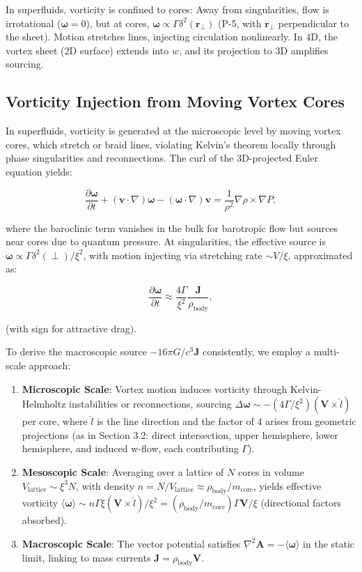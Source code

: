 \documentclass{article}
\begin{document}
In superfluids, vorticity is confined to cores: Away from singularities, flow is irrotational ($\boldsymbol{\omega} = 0$), but at cores, $\boldsymbol{\omega} \propto \Gamma \delta^2(\mathbf{r}_\perp)$ (P-5, with $\mathbf{r}_\perp$ perpendicular to the sheet). Motion stretches lines, injecting circulation nonlinearly. In 4D, the vortex sheet (2D surface) extends into $w$, and its projection to 3D amplifies sourcing.

\subsection{Vorticity Injection from Moving Vortex Cores}

In superfluids, vorticity is generated at the microscopic level by moving vortex cores, which stretch or braid lines, violating Kelvin's theorem locally through phase singularities and reconnections. The curl of the 3D-projected Euler equation yields:

\[
\frac{\partial \boldsymbol{\omega}}{\partial t} + (\mathbf{v} \cdot \nabla) \boldsymbol{\omega} - (\boldsymbol{\omega} \cdot \nabla) \mathbf{v} = \frac{1}{\rho^2} \nabla \rho \times \nabla P,
\]

where the baroclinic term vanishes in the bulk for barotropic flow but sources near cores due to quantum pressure. At singularities, the effective source is $\boldsymbol{\omega} \propto \Gamma \delta^2(\perp) / \xi^2$, with motion injecting via stretching rate $\sim V / \xi$, approximated as:

\[
\frac{\partial \boldsymbol{\omega}}{\partial t} \approx \frac{4 \Gamma}{\xi^2} \frac{\mathbf{J}}{\rho_{\text{body}}},
\]

(with sign for attractive drag).

To derive the macroscopic source $-16\pi G / c^3 \mathbf{J}$ consistently, we employ a multi-scale approach:

\begin{enumerate}
    \item \textbf{Microscopic Scale}: Vortex motion induces vorticity through Kelvin-Helmholtz instabilities or reconnections, sourcing $\Delta \boldsymbol{\omega} \sim - (4 \Gamma / \xi^2) (\mathbf{V} \times \hat{l})$ per core, where $\hat{l}$ is the line direction and the factor of 4 arises from geometric projections (as in Section 3.2: direct intersection, upper hemisphere, lower hemisphere, and induced w-flow, each contributing $\Gamma$).
    \item \textbf{Mesoscopic Scale}: Averaging over a lattice of $N$ cores in volume $V_{\text{lattice}} \sim \xi^3 N$, with density $n = N / V_{\text{lattice}} \approx \rho_{\text{body}} / m_{\text{core}}$, yields effective vorticity $\langle \boldsymbol{\omega} \rangle \sim n \Gamma \xi (\mathbf{V} \times \hat{l}) / \xi^2 = (\rho_{\text{body}} / m_{\text{core}}) \Gamma \mathbf{V} / \xi$ (directional factors absorbed).
    \item \textbf{Macroscopic Scale}: The vector potential satisfies $\nabla^2 \mathbf{A} = - \langle \boldsymbol{\omega} \rangle$ in the static limit, linking to mass currents $\mathbf{J} = \rho_{\text{body}} \mathbf{V}$.
\end{enumerate}
\end{document}
